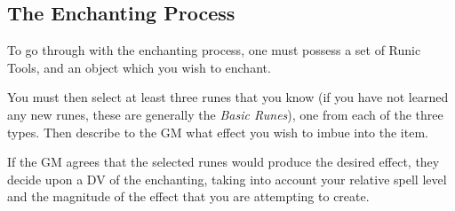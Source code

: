 \learnText









\subsection{The Enchanting Process}

To go through with the enchanting process, one must possess a set of Runic Tools, and an object which you wish to enchant. 

You must then select at least three runes that you know (if you have not learned any new runes, these are generally the {\it Basic Runes}), one from each of the three types. Then describe to the GM what effect you wish to imbue into the item. 

If the GM agrees that the selected runes would produce the desired effect, they decide upon a DV of the enchanting, taking into account your relative spell level and the magnitude of the effect that you are attempting to create. 

